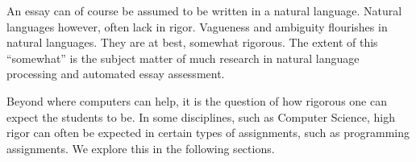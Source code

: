 An essay can of course be assumed to be written in a natural language. Natural
languages however, often lack in rigor. Vagueness and ambiguity flourishes in
natural languages. They are at best, somewhat rigorous. The extent of this
``somewhat'' is the subject matter of much research in natural language
processing and automated essay assessment\cite{valenti-et-al-2003}.

Beyond where computers can help, it is the question of how rigorous one can
expect the students to be. In some disciplines, such as Computer Science, high
rigor can often be expected in certain types of assignments, such as
programming assignments. We explore this in the following sections.

















